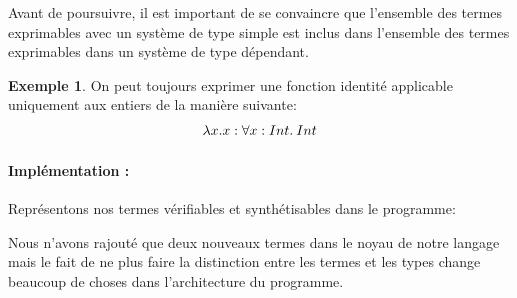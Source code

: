 \documentclass {article}
\newcommand{\codefrom}[3]
           {}
\theoremstyle{definition}
\newtheorem{example}{Exemple}
\theoremstyle{remark}
\begin{document}
Avant de poursuivre, il est important de se convaincre que l'ensemble des termes exprimables avec un système 
de type simple est inclus dans l'ensemble des termes exprimables dans un système de type dépendant.
\begin{example}
  On peut toujours exprimer une fonction identité applicable uniquement aux entiers de la manière suivante:
  \begin{align*}
    &\lambda x. x : \forall x:Int.\: Int \\
  \end{align*}
\end{example}

\paragraph{Implémentation :} 

Représentons nos termes vérifiables et synthétisables dans le programme:
\codefrom{dependent}{lambda}{inTm_head}
\codefrom{dependent}{lambda}{inTm}
\codefrom{dependent}{lambda}{exTm_head}
\codefrom{dependent}{lambda}{exTm}

Nous n'avons rajouté que deux nouveaux termes dans le noyau de notre langage mais 
le fait de ne plus faire la distinction entre les termes et les types change beaucoup de
choses dans l'architecture du programme. 
\end{document}
